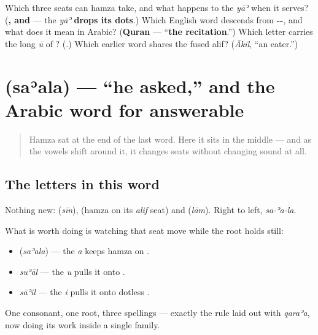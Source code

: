 \begin{tcolorbox}[breakable,colback=teal!4,colframe=teal!35!black,title={Before you move on}]
Which three seats can hamza take, and what happens to the \emph{yāʾ} when it serves? (\textbf{,  and } — the \emph{yāʾ} \textbf{drops its dots}.) Which English word descends from \textbf{--}, and what does it mean in Arabic? (\textbf{Quran} — \textquotedblleft{}\textbf{the recitation}.\textquotedblright{}) Which letter carries the long \emph{ū} of \textbf{}? (\textbf{}.) Which earlier word shares the fused alif? (\emph{Ākil}, \textquotedblleft{}an eater.\textquotedblright{})
\end{tcolorbox}
\section[\texorpdfstring{\ar{سأل} (saʾala)}{سأل (saʾala)}]{ (saʾala) — \textquotedblleft{}he asked,\textquotedblright{} and the Arabic word for answerable}

\label{lesson:AR-C31-saala}



\begin{quote}
Hamza sat at the end of the last word. Here it sits in the middle — and as the vowels shift around it, it changes seats without changing sound at all.
\end{quote}

\subsection*{The letters in this word}
Nothing new: \textbf{} (\emph{sīn}), \textbf{} (hamza on its \emph{alif} seat) and \textbf{} (\emph{lām}). Right to left, \emph{sa-ʾa-la}.

What is worth doing is watching that seat move while the root holds still:

\begin{itemize}
\raggedright
  \item \textbf{} (\emph{saʾala}) — the \emph{a} keeps hamza on \textbf{}.
  \item \emph{suʾāl} — the \emph{u} pulls it onto \textbf{}.
  \item \emph{sāʾil} — the \emph{i} pulls it onto dotless \textbf{}.
\end{itemize}

One consonant, one root, three spellings — exactly the rule laid out with \emph{qaraʾa}, now doing its work inside a single family.


